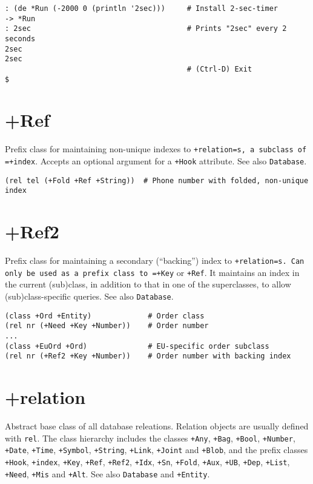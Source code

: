 {{{{{{{{\begin{verbatim}
: (de *Run (-2000 0 (println '2sec)))     # Install 2-sec-timer
-> *Run
: 2sec                                    # Prints "2sec" every 2 seconds
2sec
2sec
                                          # (Ctrl-D) Exit
$
\end{verbatim}

 
\section{+Ref}
\label{sec-8-1-18-2}


Prefix class for maintaining non-unique indexes to \texttt{+relation=s, a subclass of =+index}. Accepts an optional argument for a \texttt{+Hook}
attribute. See also \texttt{Database}.


\begin{verbatim}
(rel tel (+Fold +Ref +String))  # Phone number with folded, non-unique index
\end{verbatim}

 
\section{+Ref2}
\label{sec-8-1-18-3}


Prefix class for maintaining a secondary (``backing'') index to
\texttt{+relation=s. Can only be used as a prefix class to =+Key} or \texttt{+Ref}. It
maintains an index in the current (sub)class, in addition to that in one
of the superclasses, to allow (sub)class-specific queries. See also
\texttt{Database}.


\begin{verbatim}
(class +Ord +Entity)             # Order class
(rel nr (+Need +Key +Number))    # Order number
...
(class +EuOrd +Ord)              # EU-specific order subclass
(rel nr (+Ref2 +Key +Number))    # Order number with backing index
\end{verbatim}

 
\section{+relation}
\label{sec-8-1-18-4}


Abstract base class of all database releations. Relation objects are
usually defined with \texttt{rel}. The class hierarchy includes the classes
\texttt{+Any}, \texttt{+Bag}, \texttt{+Bool}, \texttt{+Number}, \texttt{+Date}, \texttt{+Time}, \texttt{+Symbol},
\texttt{+String}, \texttt{+Link}, \texttt{+Joint} and \texttt{+Blob}, and the prefix classes
\texttt{+Hook}, \texttt{+index}, \texttt{+Key}, \texttt{+Ref}, \texttt{+Ref2}, \texttt{+Idx}, \texttt{+Sn}, \texttt{+Fold},
\texttt{+Aux}, \texttt{+UB}, \texttt{+Dep}, \texttt{+List}, \texttt{+Need}, \texttt{+Mis} and \texttt{+Alt}. See also
\texttt{Database} and \texttt{+Entity}.

}}}}}}}}
